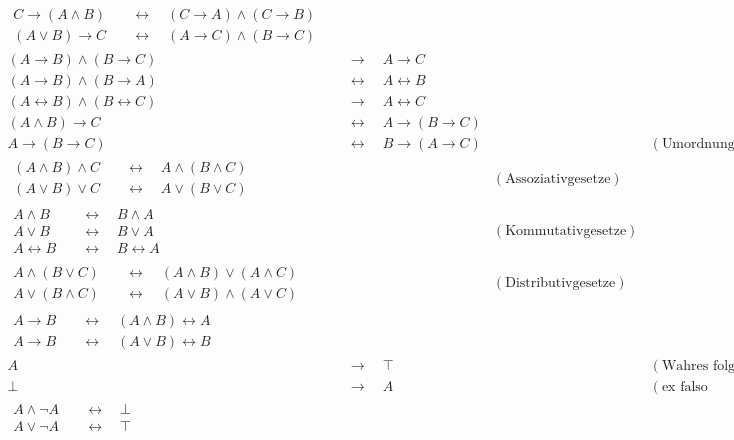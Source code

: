 \begin{align*}
    \begin{split}
        C\to (A\land B) & \quad\leftrightarrow\quad (C\to A) \land (C\to B) \\
        (A\lor B) \to C & \quad\leftrightarrow\quad (A\to C) \land (B\to C)
    \end{split} \\[1em]
    (A \to B) \land (B \to C) & \quad \to\quad A \to C \\ 
    (A \to B) \land (B \to A) & \quad\leftrightarrow\quad A \leftrightarrow B \\
    (A\leftrightarrow B)\land (B\leftrightarrow C) & \quad \to\quad A\leftrightarrow C \\[1em]
    (A \land B) \to C & \quad\leftrightarrow\quad A \to (B \to C) \\
    A \to (B \to C) & \quad\leftrightarrow\quad  B \to (A \to C) && ( \text{Umordnung der Prämissen}) \\[1em]
    \begin{split}
        (A \land B) \land C & \quad\leftrightarrow\quad A \land (B \land C) \\
        (A \lor B) \lor C & \quad\leftrightarrow\quad  A \lor (B \lor C)
    \end{split} && (\text{Assoziativgesetze}) \\[1em]
    \begin{split}
        A \land B & \quad\leftrightarrow\quad  B \land A \\
        A \lor B & \quad\leftrightarrow\quad  B \lor A \\
        A\leftrightarrow B &\quad\leftrightarrow\quad  B \leftrightarrow A
    \end{split} && ( \text{Kommutativgesetze}) \\[1em]
    \begin{split} A \land (B \lor C) & \quad\leftrightarrow\quad  (A \land B) \lor (A \land C) \\
        A \lor (B \land C) & \quad\leftrightarrow\quad  (A \lor B) \land (A \lor C)
    \end{split} && ( \text{Distributivgesetze}) \\[1em]
    \begin{split}
        A \to B & \quad\leftrightarrow\quad (A \land B) \leftrightarrow A \\
        A \to B & \quad\leftrightarrow\quad (A \lor B) \leftrightarrow B
    \end{split} \\[1em]
    A & \quad\to\quad \top && (\text{Wahres folgt aus Beliebigem}) \\
    \bot & \quad\to\quad A && (\text{ex falso quodlibet}) \\[1em]
    \begin{split}
        A \land \neg A & \quad\leftrightarrow\quad \bot \\
        A \lor \neg A & \quad\leftrightarrow\quad \top
    \end{split}
\end{align*}
